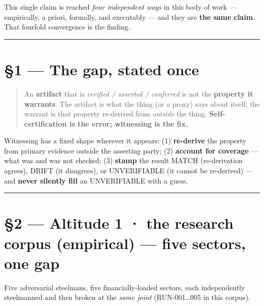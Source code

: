 \documentclass[11pt]{article}
\begin{document}
This single claim is reached \emph{four independent ways} in this body of work — empirically, a priori, formally, and executably — and they are \textbf{the same claim}. That fourfold convergence is the finding.

\medskip\noindent\rule{\linewidth}{0.3pt}\medskip

\section*{§1 — The gap, stated once}

\begin{quote}
An \textbf{artifact} that is \emph{verified /\allowbreak{} asserted /\allowbreak{} conferred} is not the \textbf{property it warrants}. The artifact is what the thing (or a proxy) says about itself; the warrant is that property re-derived from \emph{outside} the thing. \textbf{Self-certification is the error; witnessing is the fix.}
\end{quote}

Witnessing has a fixed shape wherever it appears: (1) \textbf{re-derive} the property from primary evidence outside the asserting party; (2) \textbf{account for coverage} — what was and was not checked; (3) \textbf{stamp} the result MATCH (re-derivation agrees), DRIFT (it disagrees), or UNVERIFIABLE (it cannot be re-derived) — and \textbf{never silently fill} an UNVERIFIABLE with a guess.

\medskip\noindent\rule{\linewidth}{0.3pt}\medskip

\section*{§2 — Altitude 1 · the research corpus (empirical) — five sectors, one gap}

Five adversarial steelmans, five financially-loaded sectors, each independently steelmanned and then broken at the \emph{same joint} (RUN-001…005 in this corpus).
\end{document}

